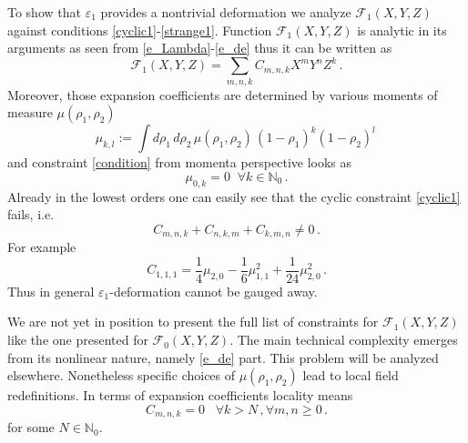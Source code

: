 \documentclass[12pt]{article}
\begin{document}
To show that $\varepsilon_1$ provides a nontrivial deformation we analyze $\mathscr{F}_1(X,Y,Z)$ against conditions \eqref{cyclic1}-\eqref{strange1}. Function $\mathscr{F}_1(X,Y,Z)$ is analytic in its arguments as seen from \eqref{e_Lambda}-\eqref{e_de} thus it can be written as
\begin{equation}
\mathscr{F}_1(X,Y,Z)=\sum_{m,n,k} C_{m,n,k} X^mY^n Z^k\,.
\end{equation}
Moreover, those expansion coefficients are determined by various moments of measure $\mu(\rho_1,\rho_2)$
\begin{equation}\label{moments}
\mu_{k,l}:=\int d\rho_1\, d\rho_2\, \mu(\rho_1,\rho_2)\, (1-\rho_1)^k(1-\rho_2)^l\,
\end{equation}
and constraint \eqref{condition} from momenta perspective looks as 
\begin{equation}\label{condition_moment}
\mu_{0,k}=0\;\;\forall k\in\mathbb{N}_0\,.
\end{equation}
Already in the lowest orders one can easily see that the cyclic constraint \eqref{cyclic1} fails, i.e.
\begin{equation}
C_{m,n,k}+C_{n,k,m}+C_{k,m,n}\neq 0\,.
\end{equation}
For example
\begin{equation}\label{C111}
C_{1,1,1}=\frac{1}{4}\mu_{2,0}-\frac{1}{6}\mu_{1,1}^2+\frac{1}{24}\mu_{2,0}^2\,.
\end{equation}
Thus in general $\varepsilon_1$-deformation cannot be gauged away.

We are not yet in position to present the full list of constraints for $\mathscr{F}_1(X,Y,Z)$ like the one presented for $\mathscr{F}_0(X,Y,Z)$. The main technical complexity emerges from its nonlinear nature, namely \eqref{e_de} part. This problem will be analyzed elsewhere. Nonetheless specific choices of $\mu(\rho_1,\rho_2)$ lead to local field redefinitions. In terms of expansion coefficients locality means
\begin{equation}\label{locality_constraint}
C_{m,n,k}=0\;\;\; \forall k >N\,, \forall m,n \geq 0\,.
\end{equation}
for some $N\in \mathbb{N}_0$.
\end{document}
